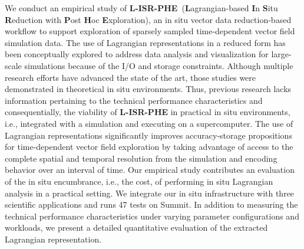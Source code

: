 We conduct an empirical study of \textbf{L-ISR-PHE}~(\textbf{L}agrangian-based \textbf{I}n \textbf{S}itu \textbf{R}eduction with \textbf{P}ost \textbf{H}oc \textbf{E}xploration), an in situ vector data reduction-based workflow to support exploration of sparsely sampled time-dependent vector field simulation data.
%
%
The use of Lagrangian representations in a reduced form has been conceptually explored to address data analysis and visualization for large-scale simulations because of the I/O and storage constraints. 
%
Although multiple research efforts have advanced the state of the art, those studies were demonstrated in theoretical in situ environments.
%
Thus, previous research lacks information pertaining to the technical performance characteristics and consequentially, the viability of \textbf{L-ISR-PHE} in practical in situ environments, i.e., integrated with a simulation and executing on a supercomputer.
%
The use of Lagrangian representations significantly improves accuracy-storage propositions for time-dependent vector field exploration by taking advantage of access to the complete spatial and temporal resolution from the simulation and encoding behavior over an interval of time.
%
Our empirical study contributes an evaluation of the in situ encumbrance, i.e., the cost, of performing in situ Lagrangian analysis in a practical setting.
%
We integrate our in situ infrastructure with three scientific applications and runs 47 tests on Summit.
%
In addition to measuring the technical performance characteristics under varying parameter configurations and workloads, we present a detailed quantitative evaluation of the extracted Lagrangian representation.
%
%



